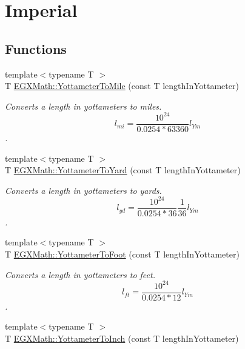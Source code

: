 \hypertarget{group___e_g_x_math-_conversions-_length_conversions-_s_i-_yottameter-_imperial}{}\section{Imperial}
\label{group___e_g_x_math-_conversions-_length_conversions-_s_i-_yottameter-_imperial}
\subsection*{Functions}
\begin{DoxyCompactItemize}
\item 
{\footnotesize template$<$typename T $>$ }\\T \mbox{\hyperlink{group___e_g_x_math-_conversions-_length_conversions-_s_i-_yottameter-_imperial_ga4ca41b9b222f31926417df30e0539b50}{E\+G\+X\+Math\+::\+Yottameter\+To\+Mile}} (const T length\+In\+Yottameter)
\begin{DoxyCompactList}\small\item\em Converts a length in yottameters to miles. \[ l_{mi}=\frac{10^{24}}{0.0254 * 63360} l_{Ym} \]. \end{DoxyCompactList}\item 
{\footnotesize template$<$typename T $>$ }\\T \mbox{\hyperlink{group___e_g_x_math-_conversions-_length_conversions-_s_i-_yottameter-_imperial_ga87f19dee341e81a7bb72bf4a5134935f}{E\+G\+X\+Math\+::\+Yottameter\+To\+Yard}} (const T length\+In\+Yottameter)
\begin{DoxyCompactList}\small\item\em Converts a length in yottameters to yards. \[ l_{yd}= \frac{10^{24}}{0.0254 * 36} \frac{1}{36} l_{Ym} \]. \end{DoxyCompactList}\item 
{\footnotesize template$<$typename T $>$ }\\T \mbox{\hyperlink{group___e_g_x_math-_conversions-_length_conversions-_s_i-_yottameter-_imperial_gae693078fe8f9b2ca717732916dcf28d7}{E\+G\+X\+Math\+::\+Yottameter\+To\+Foot}} (const T length\+In\+Yottameter)
\begin{DoxyCompactList}\small\item\em Converts a length in yottameters to feet. \[ l_{ft}= \frac{10^{24}}{0.0254 * 12} l_{Ym} \]. \end{DoxyCompactList}\item 
{\footnotesize template$<$typename T $>$ }\\T \mbox{\hyperlink{group___e_g_x_math-_conversions-_length_conversions-_s_i-_yottameter-_imperial_ga6de8b1bd4812d6814328cb5d54adf08c}{E\+G\+X\+Math\+::\+Yottameter\+To\+Inch}} (const T length\+In\+Yottameter)

\end{DoxyCompactItemize}
